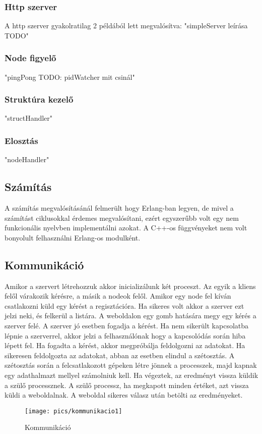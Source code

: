 	\subsubsection{Http szerver}
	A http szerver gyakolratilag 2 példából lett megvalósítva:
	"simpleServer leírása TODO"
	\subsubsection{Node figyelő}
	"pingPong TODO: pidWatcher mit csinál"
	\subsubsection{Struktúra kezelő}
	"structHandler"
	\subsubsection{Elosztás}
	"nodeHandler"

\subsection{Számítás}
	A számítás megvalósításánál felmerült hogy Erlang-ban legyen, de mivel a számítást ciklusokkal érdemes megvalósítani, ezért egyszerűbb volt egy nem funkcionális nyelvben implementálni azokat.
	A C++-os függvényeket nem volt bonyolult felhasználni Erlang-os modulként. 

\subsection{Kommunikáció}
	Amikor a szervert létrehozzuk akkor inicializálunk két proceszt. Az egyik a kliens felől várakozik kérésre, a másik a nodeok felől. Amikor egy node fel kíván csatlakozni küld egy kérést a regisztációra. Ha sikeres volt akkor a szerver ezt jelzi neki, és felkerül a listára. \newline
	A weboldalon egy gomb hatására megy egy kérés a szerver felé. A szerver jó esetben fogadja a kérést. Ha nem sikerült kapcsolatba lépnie a szerverrel, akkor jelzi a felhasználónak hogy a kapcsolódás során hiba lépett fel. \newline
	Ha fogadta a kérést, akkor megpróbálja feldolgozni az adatokat. Ha sikeresen feldolgozta az adatokat, abban az esetben elindul a szétosztás. \newline
	A szétosztás során a felcsatlakozott gépeken létre jönnek a processzek, majd kapnak egy adathalmazt mellyel számolniuk kell. Ha végeztek, az eredményt vissza küldik a szülő processznek. A szülő processz, ha megkapott minden értéket, azt vissza küldi a weboldalnak.
	\newline
	A weboldal sikeres válasz után betölti az eredményeket. 
	\begin{figure}[h]
		\texttt{[image: pics/kommunikacio1]}
	\centering
	\caption{Kommunikáció\label{fig:kommunikacio1}}
	\end{figure}


